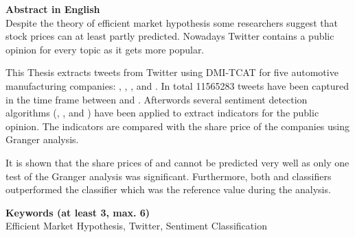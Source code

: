 
\newcommand*{\AbstractHead}[1]{%
{\noindent\color{header-blue}\Large\textbf{#1}}
\vspace{10pt}\\
}%

\newcommand*{\SomeSpace}{%
\vspace{\baselineskip}
}

\AbstractHead{Abstract in English}
\noindent
\normalsize
Despite the theory of efficient market hypothesis some researchers suggest that stock prices can at least partly predicted.
Nowadays Twitter contains a public opinion for every topic as it gets more popular.

This Thesis extracts tweets from Twitter using DMI-TCAT for five automotive manufacturing companies: \ford{}, \gm{}, \hyundai{}, \toyota{} and \vw{}.
In total \num{11565283} tweets have been captured in the time frame between  and .
Afterwords several sentiment detection algorithms (\tb{}, \nb{}, \me{} and \svm{}) have been applied to extract indicators for the public opinion.
The indicators are compared with the share price of the companies using Granger analysis.

It is shown that the share prices of \ford{} and \hyundai{} cannot be predicted very well as only one test of the Granger analysis was significant.
Furthermore, both \svm{} and \nb{} classifiers outperformed the \tb{} classifier which was the reference value during the analysis.


\SomeSpace
\AbstractHead{Keywords (at least 3, max. 6)}
\normalsize
\noindent
Efficient Market Hypothesis, Twitter, Sentiment Classification

\SomeSpace

